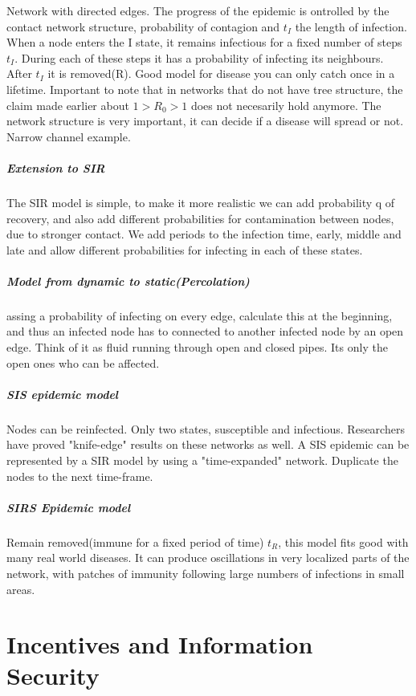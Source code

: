 Network with directed edges. The progress of the epidemic is ontrolled by the contact network
 structure, probability of contagion and $t_{I}$ the length of infection.
When a node enters the I state, it remains infectious for a fixed number of steps $t_{I}$. 
During each of these steps it has a probability of infecting its neighbours. 
After $t_{I}$ it is removed(R). Good model for disease you can only catch once in a lifetime. 
Important to note that in networks that do not have tree structure, the claim made earlier about $1>R_{0}>1$ does not necesarily hold anymore. The network structure is very important, 
it can decide if a disease will spread or not.  Narrow channel example. 
\subparagraph{Extension to SIR}
The SIR model is simple, to make it more realistic we can add probability q of recovery, and also add different probabilities for contamination between nodes, due to stronger contact. We add periods to the infection time, early, middle and late and allow different probabilities for infecting in each of these states. 

\subparagraph{Model from dynamic to static(Percolation)}
assing a probability of infecting on every edge, calculate this at the beginning, and thus an infected
 node has to connected to another infected node by an open edge. Think of it as fluid running through open and closed pipes. Its only the open ones who can be affected. 
 
 \subparagraph{SIS epidemic model}
 Nodes can be reinfected. Only two states, susceptible and infectious. Researchers have proved "knife-edge" results on these networks as well.
 A SIS epidemic can be represented by a SIR model by using a "time-expanded" network. Duplicate the nodes to the next time-frame.
 \subparagraph{SIRS Epidemic model}
 Remain removed(immune for a fixed period of time) $t_{R}$, this model fits good with many real 
 world diseases. It can produce oscillations in  very localized parts of the network, with patches of
  immunity following large numbers of infections in small areas. 

\section{Incentives and Information Security}


